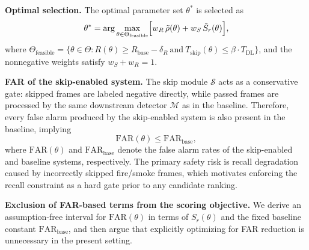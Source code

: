 \textbf{Optimal selection.}
The optimal parameter set $\theta^*$ is selected as
\begin{equation}
    \theta^*
    = \arg\max_{\theta \in \Theta_{\text{feasible}}}
      \Bigl[
          w_R\,\tilde{\rho}(\theta)
          +
          w_S\,\tilde{S}_r(\theta)
      \Bigr],
\end{equation}
where $\Theta_{\text{feasible}} = \{\theta \in \Theta :
R(\theta) \geq R_{\text{base}} - \delta_R
\ \text{and}\ T_{\text{skip}}(\theta) \leq \beta \cdot T_{\text{DL}}\}$,
and the nonnegative weights satisfy $w_S + w_R = 1$.

\textbf{FAR of the skip-enabled system.} The skip module $\mathcal{S}$ acts as
a conservative gate: skipped frames are labeled negative directly, while passed
frames are processed by the same downstream detector $\mathcal{M}$ as in the
baseline. Therefore, every false alarm produced by the skip-enabled system is
also present in the baseline, implying
\begin{equation}
    \mathrm{FAR}(\theta) \leq \mathrm{FAR}_{\text{base}},
\end{equation}
where $\mathrm{FAR}(\theta)$ and $\mathrm{FAR}_{\text{base}}$ denote the false
alarm rates of the skip-enabled and baseline systems, respectively. The primary
safety risk is recall degradation caused by incorrectly skipped fire/smoke
frames, which motivates enforcing the recall constraint as a hard gate prior to
any candidate ranking.

\textbf{Exclusion of FAR-based terms from the scoring objective.}
We derive an assumption-free interval for $\mathrm{FAR}(\theta)$ in terms of
$S_r(\theta)$ and the fixed baseline constant
$\mathrm{FAR}_{\text{base}}$, and then argue that explicitly optimizing
for FAR reduction is unnecessary in the present setting.

